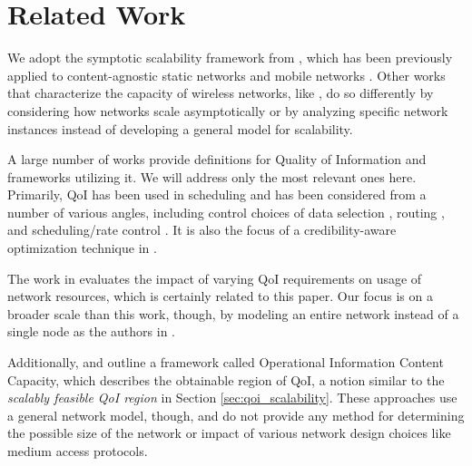 
\section{Related Work}
\label{sec:related_work}


We adopt the symptotic scalability framework from \cite{scalability_manets_theory_vs_practice}, which has been previously applied to content-agnostic static networks \cite{symptotics_framework_scalability} and mobile networks \cite{scal_analysis_mobility}.  Other works that characterize the capacity of wireless networks, like \cite{li_capacity, gupta2000capacity, nom_cap_wmns}, do so differently by considering how networks scale asymptotically or by analyzing specific network instances instead of developing a general model for scalability.

A large number of works provide definitions for Quality of Information and frameworks utilizing it.  We will address only the most relevant ones here.  Primarily, QoI has been used in scheduling and has been considered from a number of various angles, including control choices of data selection \cite{dcoss_max_cov, opt_qoi_data_collection_bijarbooneh}, routing \cite{quality_aware_routing_tan}, and scheduling/rate control \cite{qoi_aware_trx_pol_time_vary_links, toward_qoi_rate_control,explor_vs_exploit, qoi_outage}.  It is also the focus of a credibility-aware optimization technique in \cite{social_swarming}.  

The work in \cite{qoi_aware_mobile_apps} evaluates the impact of varying QoI requirements on usage of network resources, which is certainly related to this paper.  Our focus is on a broader scale than this work, though, by modeling an entire network instead of a single node as the authors in \cite{qoi_aware_mobile_apps}.

Additionally, \cite{qoi_aware_tactical_mil_nets} and \cite{oiccm} outline a framework called Operational Information Content Capacity, which describes the obtainable region of QoI, a notion similar to the \emph{scalably feasible QoI region} in Section \ref{sec:qoi_scalability}.  These approaches use a general network model, though, and do not provide any method for determining the possible size of the network or impact of various network design choices like medium access protocols.   %

